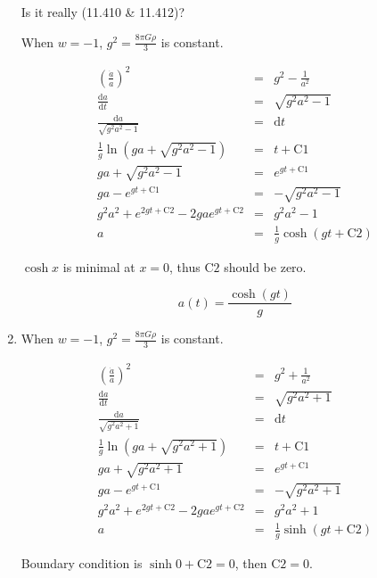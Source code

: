 \documentclass[12pt,a4paper]{article}
\begin{document}
\begin{enumerate}
{\color{red} Is it really (11.410 \& 11.412)?}

When $w=-1$, $g^2=\frac{8\pi G \rho}{3}$ is constant.

\begin{eqnarray*}
	\left( \frac{\dot a}{a} \right)^2 &=& g^2 - \frac{1}{a^2} \\
	\frac{\mathrm d a}{\mathrm dt} &=& \sqrt{g^2a^2 - 1} \\
	\frac{\mathrm d a}{\sqrt{g^2 a^2 - 1 }} &=& \mathrm dt
\\
	\frac{1}{g}\ln(g a +\sqrt{g^2a^2 - 1}) &=& t + \mathrm{C1} \\
	ga+\sqrt{g^2a^2 -1} &=& e^{gt+\mathrm{C1}} \\
	ga - e^{gt+\mathrm{C1}} &=& - \sqrt{g^2a^2 -1} \\
	g^2a^2 + e^{2gt+\mathrm{C2}} - 2 g a e^{gt+\mathrm{C2}} &=& g^2 a^2 -1 \\
	a &=& \frac{1}{g} \cosh(gt+\mathrm{C2})
\end{eqnarray*}

$\cosh{x}$ is minimal at $x=0$, thus $\mathrm{C2}$ should be zero.

\begin{equation*}
	a(t)=\frac{\cosh(gt)}{g}
\end{equation*}





\item


When $w=-1$, $g^2=\frac{8\pi G \rho}{3}$ is constant.

\begin{eqnarray*}
	\left( \frac{\dot a}{a} \right)^2 &=& g^2 + \frac{1}{a^2} \\
	\frac{\mathrm d a}{\mathrm dt} &=& \sqrt{g^2a^2 + 1} \\
	\frac{\mathrm d a}{\sqrt{g^2 a^2 + 1 }} &=& \mathrm dt
\\
	\frac{1}{g}\ln(g a +\sqrt{g^2a^2 + 1}) &=& t + \mathrm{C1} \\
	ga+\sqrt{g^2a^2 + 1} &=& e^{gt+\mathrm{C1}} \\
	ga - e^{gt+\mathrm{C1}} &=& - \sqrt{g^2a^2 + 1} \\
	g^2 a^2 + e^{2gt+\mathrm{C2}} - 2 g a e^{gt+\mathrm{C2}} &=& g^2 a^2  + 1 \\
	a &=& \frac{1}{g} \sinh(gt+\mathrm{C2})
\end{eqnarray*}

Boundary condition is $\sinh{0 + \mathrm{C2}}=0$, then $\mathrm{C2}=0$.


\end{enumerate}
\end{document}
